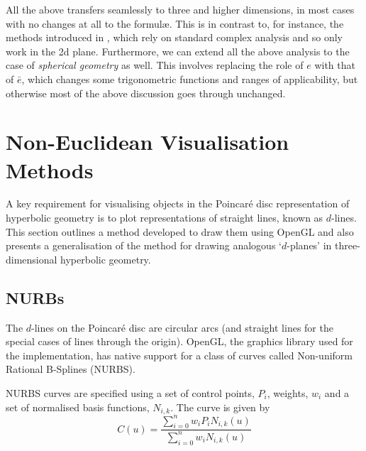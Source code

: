 All the above transfers seamlessly to three and higher dimensions, in
most cases with no changes at all to the formul\ae. This is in
contrast to, for instance, the methods introduced in \cite{brannan}, which
rely on standard complex analysis and so only work in the 2d
plane. Furthermore, we can extend all the above analysis to the
case of \textit{spherical geometry} as well. This involves
replacing the role of $e$ with that of $\bar{e}$, which changes
some trigonometric functions and ranges of applicability, but
otherwise most of the above discussion goes through unchanged.


\section{Non-Euclidean Visualisation Methods}
\label{sec:noneuclid-vis}

A key requirement for visualising objects in the Poincar\'e disc
representation of hyperbolic geometry is to plot representations of
straight lines, known as $d$-lines. This section outlines a method 
developed to draw them using OpenGL and also presents a generalisation
of the method for drawing analogous `$d$-planes' in three-dimensional
hyperbolic geometry.

\subsection{NURBs}

The $d$-lines on the Poincar\'e disc are circular arcs (and straight lines
for the special cases of lines through the origin). OpenGL, the graphics
library used for the implementation, has native support for a class
of curves called Non-uniform Rational B-Splines (NURBS)\cite{mecg}. 


NURBS curves are specified using a set of control points, $P_i$,
weights, $w_i$ and a set of normalised basis functions, $N_{i,k}$.
The curve is given by
\[
C(u) = \frac{\sum_{i=0}^n w_i P_i N_{i,k}(u)}{\sum_{i=0}^n w_i N_{i,k}(u)}
\]

